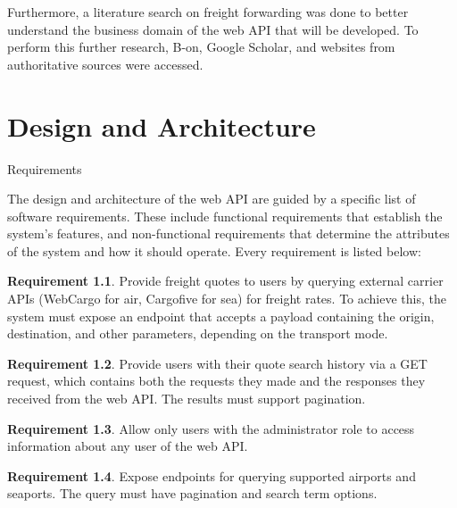 \documentclass[12pt, reqno, oneside]{amsbook}
\makeatletter
\def\section{\@startsection{section}{1}%
      \z@{.5\linespacing\@plus.7\linespacing}{.25\linespacing}%
      {\normalfont\bfseries\flushleft}}
\theoremstyle{definition}
\theoremstyle{definition}
\newtheorem{requirement}{Requirement}
\numberwithin{section}{chapter}
\numberwithin{table}{chapter}
\numberwithin{figure}{chapter}
\makeatother
\begin{document}
Furthermore, a literature search on freight forwarding was done to better understand the business domain of the web API that will be developed. To perform this further research, B-on, Google Scholar, and websites from authoritative sources were accessed.

\chapter{Design and Architecture}
\label{Chapter:Design_And_Architecture}

\section{Requirements}
\label{Section:Requirements}

The design and architecture of the web \ac{API} are guided by a specific list of software requirements. These include functional requirements that establish the system's features, and non-functional requirements that determine the attributes of the system and how it should operate. Every requirement is listed below:

\begin{requirement}
  \label{Requirement:1}
  Provide freight quotes to users by querying external carrier \acp{API} (WebCargo for air, Cargofive for sea) for freight rates. To achieve this, the system must expose an endpoint that accepts a payload containing the origin, destination, and other parameters, depending on the transport mode.
\end{requirement}

\begin{requirement}
  \label{Requirement:2}
  Provide users with their quote search history via a GET request, which contains both the requests they made and the responses they received from the web \ac{API}. The results must support pagination.
\end{requirement}

\begin{requirement}
  \label{Requirement:3}
  Allow only users with the administrator role to access information about any user of the web \ac{API}.
\end{requirement}

\begin{requirement}
  \label{Requirement:4}
  Expose endpoints for querying supported airports and seaports. The query must have pagination and search term options.
\end{requirement}
\end{document}
